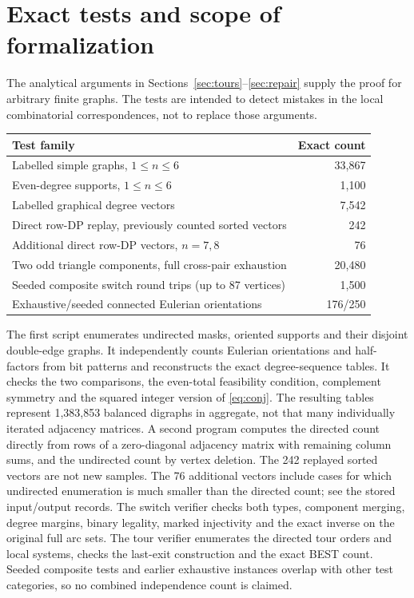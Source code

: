 \documentclass[11pt]{article}
\theoremstyle{remark}\newtheorem{remark}[theorem]{Remark}
\begin{document}
\section{Exact tests and scope of formalization}
The analytical arguments in Sections~\ref{sec:tours}--\ref{sec:repair} supply the proof for arbitrary finite graphs. The tests are intended to detect mistakes in the local combinatorial correspondences, not to replace those arguments.
\begin{center}
\begin{tabular}{lr}
\toprule
Test family & Exact count\\
\midrule
Labelled simple graphs, $1\le n\le6$ & 33,867\\
Even-degree supports, $1\le n\le6$ & 1,100\\
Labelled graphical degree vectors & 7,542\\
Direct row-DP replay, previously counted sorted vectors & 242\\
Additional direct row-DP vectors, $n=7,8$ & 76\\
Two odd triangle components, full cross-pair exhaustion & 20,480\\
Seeded composite switch round trips (up to 87 vertices) & 1,500\\
Exhaustive/seeded connected Eulerian orientations & 176/250\\
\bottomrule
\end{tabular}
\end{center}
The first script enumerates undirected masks, oriented supports and their disjoint double-edge graphs. It independently counts Eulerian orientations and half-factors from bit patterns and reconstructs the exact degree-sequence tables. It checks the two comparisons, the even-total feasibility condition, complement symmetry and the squared integer version of \eqref{eq:conj}. The resulting tables represent 1,383,853 balanced digraphs in aggregate, not that many individually iterated adjacency matrices. A second program computes the directed count directly from rows of a zero-diagonal adjacency matrix with remaining column sums, and the undirected count by vertex deletion. The 242 replayed sorted vectors are not new samples. The 76 additional vectors include cases for which undirected enumeration is much smaller than the directed count; see the stored input/output records. The switch verifier checks both types, component merging, degree margins, binary legality, marked injectivity and the exact inverse on the original full arc sets. The tour verifier enumerates the directed tour orders and local systems, checks the last-exit construction and the exact BEST count. Seeded composite tests and earlier exhaustive instances overlap with other test categories, so no combined independence count is claimed.
\end{document}
